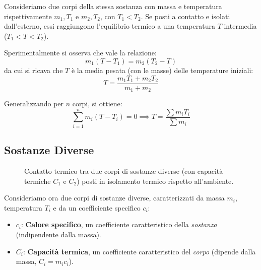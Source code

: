 Consideriamo due corpi della stessa sostanza con massa e temperatura rispettivamente $m_1, T_1$ e $m_2, T_2$, con $T_1 < T_2$.
Se posti a contatto e isolati dall'esterno, essi raggiungono l'equilibrio termico a una temperatura $T$ intermedia ($T_1 < T < T_2$).

Sperimentalmente si osserva che vale la relazione:
\begin{equation}
m_1 (T - T_1) = m_2 (T_2 - T)
\end{equation}
da cui si ricava che $T$ è la media pesata (con le masse) delle temperature iniziali:
\begin{equation}
T = \frac{m_1 T_1 + m_2 T_2}{m_1 + m_2}
\end{equation}

Generalizzando per $n$ corpi, si ottiene:
\begin{equation}
\sum_{i=1}^n m_i (T - T_i) = 0 \implies T = \frac{\sum m_i T_i}{\sum m_i}
\end{equation}

\subsection{Sostanze Diverse}

\begin{figure}[ht]
\centering
{}
\caption{Contatto termico tra due corpi di sostanze diverse (con capacità termiche $C_1$ e $C_2$) posti in isolamento termico rispetto all'ambiente.}
\end{figure}

Consideriamo ora due corpi di sostanze diverse, caratterizzati da massa $m_i$, temperatura $T_i$ e da un coefficiente specifico $c_i$:
\begin{itemize}
    \item $c_i$: \textbf{Calore specifico}, un coefficiente caratteristico della \textit{sostanza} (indipendente dalla massa).
    \item $C_i$: \textbf{Capacità termica}, un coefficiente caratteristico del \textit{corpo} (dipende dalla massa, $C_i = m_i c_i$).
\end{itemize}

